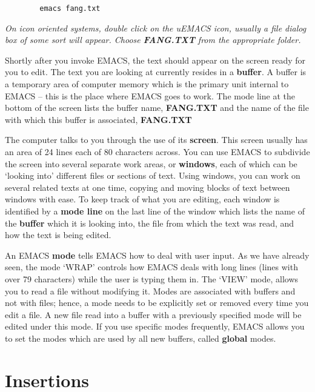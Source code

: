 \begin{verbatim}
        emacs fang.txt
\end{verbatim}

{\it{}On icon oriented systems, double click on the uEMACS icon, usually a
file dialog box of some sort will appear.  Choose {\bf{}FANG.TXT} from the
appropriate folder.}

Shortly after you invoke EMACS, the text should appear on the screen
ready for you to edit.  The text you are looking at currently resides in
a {\bf{}buffer}.  A buffer is a temporary area of computer memory which is
 the primary unit internal to EMACS -- this is the place
where EMACS goes to work.  The mode line at the bottom of the screen
lists the buffer name, {\bf{}FANG.TXT} and the name of the file with which
this buffer is associated, {\bf{}FANG.TXT}

The computer talks to you through the use of its {\bf{}screen}.  This
 screen usually has an area of 24 lines each of 80
characters across.  You can use EMACS to subdivide the screen into
several separate work areas, or {\bf{}windows}, each of which can be
 `looking into' different files or sections of text.  Using
windows, you can work on several related texts at one time, copying and
moving blocks of text between windows with ease.  To keep track of what
you are editing, each window is identified by a {\bf{}mode line} on the
  last line of the window which lists the
name of the {\bf{}buffer} which it is looking into, the file from which the
text was read, and how the text is being edited.

An EMACS {\bf{}mode} tells EMACS how to deal with user input.  As we have
already seen, the mode `WRAP' controls how EMACS deals with long lines
(lines with over 79 characters) while the user is typing them in.  The
`VIEW' mode, allows you to read a file without modifying it.  Modes are
associated with buffers and not with files; hence, a mode needs to be
explicitly set or removed every time you edit a file.  A new file read
into a buffer with a previously specified mode will be edited under this
mode.  If you use specific modes frequently, EMACS allows you to set
the modes which are used by all new buffers, called {\bf{}global} modes.

\section{Insertions}

